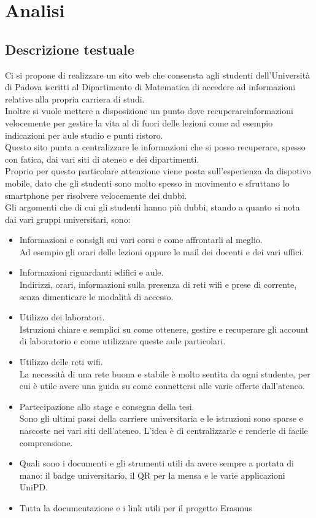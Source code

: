 \section{Analisi}
\subsection{Descrizione testuale}

Ci si propone di realizzare un sito web che consensta agli studenti dell'Università di Padova iscritti al Dipartimento di Matematica di accedere ad informazioni relative alla propria carriera di studi.\\
Inoltre si vuole mettere a disposizione un punto dove recuperareinformazioni velocemente per gestire la vita al di fuori delle lezioni come ad esempio indicazioni per aule studio e punti ristoro.\\
Questo sito punta a centralizzare le informazioni che si posso recuperare, spesso con fatica, dai vari siti di ateneo e dei dipartimenti.\\
Proprio per questo particolare attenzione viene posta sull'esperienza da dispotivo mobile, dato che gli studenti sono molto spesso in movimento e sfruttano lo smartphone per risolvere velocemente dei dubbi.\\
Gli argomenti che di cui gli studenti hanno più dubbi, stando a quanto si nota dai vari gruppi universitari, sono:
\begin{itemize}
    \item Informazioni e consigli sui vari corsi e come affrontarli al meglio. \\ Ad esempio gli orari delle lezioni oppure le mail dei docenti e dei vari uffici.
    \item Informazioni riguardanti edifici e aule.\\ Indirizzi, orari, informazioni sulla presenza di reti wifi e prese di corrente, senza dimenticare le modalità di accesso.
    \item Utilizzo dei laboratori. \\ Istruzioni chiare e semplici su come ottenere, gestire e recuperare gli account di laboratorio e come utilizzare queste aule particolari.
    \item Utilizzo delle reti wifi. \\ La necessità di una rete buona e stabile è molto sentita da ogni studente, per cui è utile avere una guida su come connettersi alle varie offerte dall'ateneo.   
    \item Partecipazione allo stage e consegna della tesi. \\ Sono gli ultimi passi della carriere universitaria e le istruzioni sono sparse e nascoste nei vari siti dell'ateneo. L'idea è di centralizzarle e renderle di facile comprensione.
    \item Quali sono i documenti e gli strumenti utili da avere sempre a portata di mano: il badge universitario, il QR per la mensa e le varie applicazioni UniPD.
    \item Tutta la documentazione e i link utili per il progetto Erasmus
\end{itemize}

